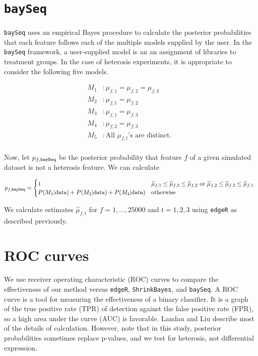 \documentclass{article}
\providecommand{\wh}[1]{\widehat{#1}}
\begin{document}
\begin{flushleft}
\section{{\tt baySeq}}

\paragraph{} {\tt baySeq} uses an empirical Bayes procedure to calculate the posterior probabilities that each feature follows each of the multiple models supplied by the user. In the {\tt baySeq} framework, a user-supplied model is an an assignment of libraries to treatment groups. In the case of heterosis experiments, it is appropriate to consider the following five models.

\begin{align*}
M_1&: \mu_{f, 1} = \mu_{f, 2} = \mu_{f, 3} \\
M_2&: \mu_{f, 1} = \mu_{f, 2} \\
M_3&: \mu_{f, 1} = \mu_{f, 3} \\
M_4&: \mu_{f, 2} = \mu_{f, 3} \\
M_5&: \text{All } \mu_{f, t}\text{'s are distinct.} \\
\end{align*}

Now, let $p_{f, {\tt baySeq}}$ be the posterior probability that feature $f$ of a given simulated dataset is not a heterosis feature. We can calculate

\begin{align*}
p_{f, {\tt baySeq}} = \begin{cases}
1 & \wh{\mu}_{f, 1} \le \wh{\mu}_{f, 3} \le \wh{\mu}_{f, 2} \text{ or } \wh{\mu}_{f, 2} \le \wh{\mu}_{f, 3} \le \wh{\mu}_{f, 1} \\
P(M_1 | \text{data}) + P(M_2 | \text{data}) + P(M_4 | \text{data}) & \text{otherwise}
\end{cases}
\end{align*}

We calculate estimates $\wh{\mu}_{f, t}$ for $f = 1, \ldots, 25000$ and $t = 1, 2, 3$ using {\tt edgeR} as described previously.

\section{ROC curves}

\paragraph{} We use receiver operating characteristic (ROC) curves to compare the effectiveness of our method versus {\tt edgeR}, {\tt ShrinkBayes}, and {\tt baySeq}. A ROC curve is a tool for measuring the effectiveness of a binary classifier. It is a graph of the true positive rate (TPR) of detection against the false positive rate (FPR), so a high area under the curve (AUC) is favorable. Landau and Liu describe most of the details of calculation. However, note that in this study, posterior probabilities sometimes replace p-values, and we test for heterosis, not differential expression.

\end{flushleft}
\end{document}
